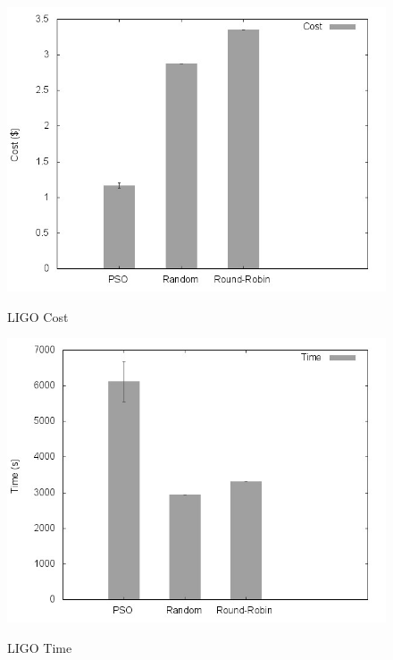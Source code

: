 \documentclass[a4paper,10pt]{article}
\begin{document}
\begin{figure}[!htb]

\centering

\includegraphics[scale=.55]{graphs/slideligo_cost.jpeg}
\label{ligo_cost}
\caption{LIGO Cost}

\includegraphics[scale=.55]{graphs/slideligo_time.jpeg}
\label{ligo_time}
\caption{LIGO Time}

\end{figure}
\end{document}
